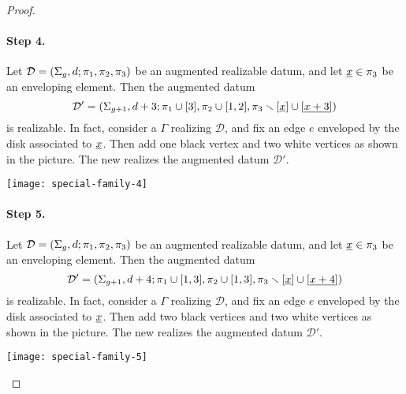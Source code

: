 \documentclass{article}
\begin{document}
\begin{proof}
\begin{paracol}{2}
\paragraph{Step 4.} Let $\mathcal{D}=\left(\Sigma_g,d;\pi_1,\pi_2,\pi_3\right)$ be an augmented realizable datum, and let $\underline{x}\in\pi_3$ be an enveloping element. Then the augmented datum
\[
\mathcal{D}'=\left(\Sigma_{g+1},d+3;\pi_1\cup[3],\pi_2\cup[1,2],\pi_3\smallsetminus[\underline{x}]\cup[\underline{x+3}]\right)
\]
is realizable. In fact, consider a \dessin{} $\Gamma$ realizing $\mathcal{D}$, and fix an edge $e$ enveloped by the disk associated to $\underline{x}$. Then add one black vertex and two white vertices as shown in the picture. The new \dessin{} realizes the augmented datum $\mathcal{D'}$.\switchcolumn
\begin{center}
\texttt{[image: special-family-4]}
\end{center}
\end{paracol}

\begin{paracol}{2}
\paragraph{Step 5.} Let $\mathcal{D}=\left(\Sigma_g,d;\pi_1,\pi_2,\pi_3\right)$ be an augmented realizable datum, and let $\underline{x}\in\pi_3$ be an enveloping element. Then the augmented datum
\[
\mathcal{D}'=\left(\Sigma_{g+1},d+4;\pi_1\cup[1,3],\pi_2\cup[1,3],\pi_3\smallsetminus[\underline{x}]\cup[\underline{x+4}]\right)
\]
is realizable. In fact, consider a \dessin{} $\Gamma$ realizing $\mathcal{D}$, and fix an edge $e$ enveloped by the disk associated to $\underline{x}$. Then add two black vertices and two white vertices as shown in the picture. The new \dessin{} realizes the augmented datum $\mathcal{D'}$.\switchcolumn
\begin{center}
\texttt{[image: special-family-5]}
\end{center}
\end{paracol}
\endgroup


\end{proof}
\end{document}
